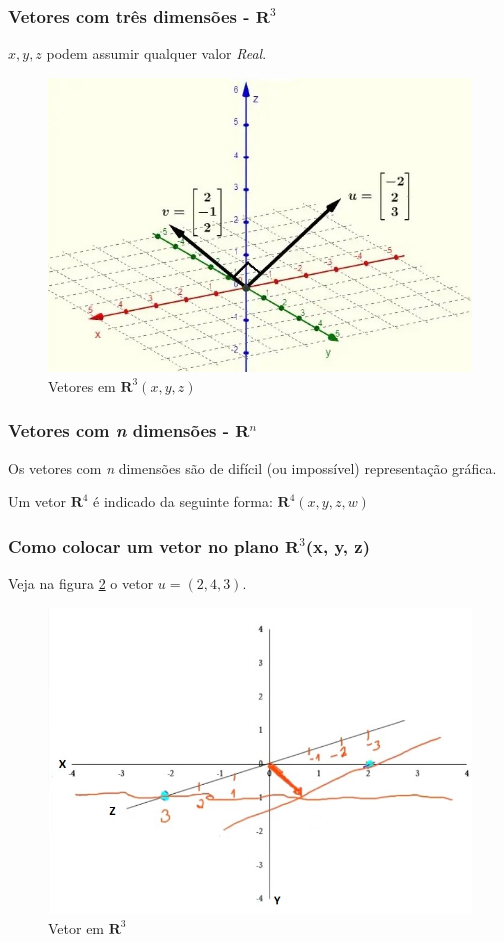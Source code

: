\documentclass[12pt]{article}
\begin{document}
\subsubsection{Vetores com três dimensões - \( \mathbf{R}^{3} \)}

\(x, y, z\) podem assumir qualquer valor \textit{Real}.

\begin{figure}[H]
	\centering
	\includegraphics[width=0.5\linewidth]{"figuras/vetores R3"}
	\caption[Vetores em \( \mathbf{R}^{3} \)]{Vetores em \( \mathbf{R}^{3} (x, y, z)\)}
	\label{fig:vetores-r3}
\end{figure}

\subsubsection{Vetores com \textit{n} dimensões - \( \mathbf{R}^{n} \)}

Os vetores com \textit{n} dimensões são de difícil (ou impossível) representação gráfica.

Um vetor \( \mathbf{R}^{4} \) é indicado da seguinte forma: \( \mathbf{R}^{4} (x, y, z, w)\)

\subsubsection{Como colocar um vetor no plano \( \mathbf{R}^{3} \)(x, y, z)}

Veja na figura \ref{fig:vetor r3} o vetor \(u = (2,4,3)\).

\begin{figure}
	\centering
	\includegraphics[width=0.7\linewidth]{figuras/R3}
	\caption[Vetor em \( \mathbf{R}^{3} \)]{Vetor em \( \mathbf{R}^{3} \)}
	\label{fig:vetor r3}
\end{figure}
\end{document}
